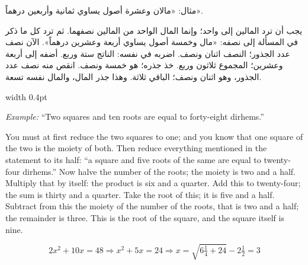 \documentclass[11pt,a4paper]{book}
\begin{document}
\vspace{0.5cm}

\noindent\begin{minipage}[t]{0.48\textwidth}
\raggedleft

\begin{Arabic}
مثال: «مالان وعشرة أصول يساوي ثمانية وأربعين درهماً».

يجب أن ترد المالين إلى واحد؛ وإنما المال الواحد من المالين نصفهما. ثم ترد كل ما ذكر في المسألة إلى نصفه: «مال وخمسة أصول يساوي أربعة وعشرين درهماً». الآن نصف عدد الجذور؛ النصف اثنان ونصف. اضربه في نفسه: الناتج ستة وربع. أضفه إلى أربعة وعشرين؛ المجموع ثلاثون وربع. خذ جذره؛ هو خمسة ونصف. انقص منه نصف عدد الجذور، وهو اثنان ونصف؛ الباقي ثلاثة. وهذا جذر المال، والمال نفسه تسعة.
\end{Arabic}

\end{minipage}%
\hfill\vrule width 0.4pt\hfill
\begin{minipage}[t]{0.48\textwidth}
\raggedright

\textit{Example:} ``Two squares and ten roots are equal to forty-eight dirhems.''

You must at first reduce the two squares to one; and you know that one square of the two is the moiety of both. Then reduce everything mentioned in the statement to its half: ``a square and five roots of the same are equal to twenty-four dirhems.'' Now halve the number of the roots; the moiety is two and a half. Multiply that by itself: the product is six and a quarter. Add this to twenty-four; the sum is thirty and a quarter. Take the root of this; it is five and a half. Subtract from this the moiety of the number of the roots, that is two and a half; the remainder is three. This is the root of the square, and the square itself is nine.

\begin{equation}
2x^2 + 10x = 48 \Rightarrow x^2 + 5x = 24 \Rightarrow
x = \sqrt{6\tfrac{1}{4} + 24} - 2\tfrac{1}{2} = 3
\end{equation}

\end{minipage}
\vspace{0.3cm}

\newpage
\end{document}
